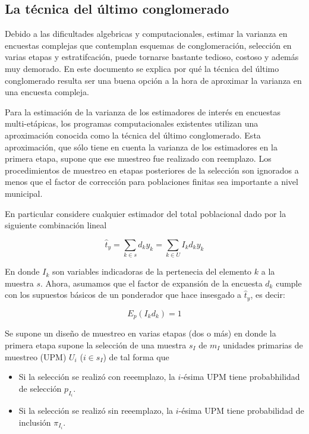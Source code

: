 \hypertarget{la-tecnica-del-ultimo-conglomerado}{%
\subsection{La técnica del último conglomerado}\label{la-tecnica-del-ultimo-conglomerado}}

Debido a las dificultades algebricas y computacionales, estimar la varianza en encuestas complejas que contemplan esquemas de conglomeración, selección en varias etapas y estratifcación, puede tornarse bastante tedioso, costoso y además muy demorado. En este documento se explica por qué la técnica del último conglomerado resulta ser una buena opción a la hora de aproximar la varianza en una encuesta compleja.

Para la estimación de la varianza de los estimadores de interés en encuestas multi-etápicas, los programas computacionales existentes utilizan una aproximación conocida como la técnica del último conglomerado. Esta aproximación, que sólo tiene en cuenta la varianza de los estimadores en la primera etapa, supone que ese muestreo fue realizado con reemplazo. Los procedimientos de muestreo en etapas posteriores de la selección son ignorados a menos que el factor de corrección para poblaciones finitas sea importante a nivel municipal.

En particular considere cualquier estimador del total poblacional dado por la siguiente combinación lineal

\begin{equation}
\label{est}
\hat{t}_{y}=\sum_{k\in s} d_k y_k = \sum_{k\in U} I_k d_k y_k 
\end{equation}

En donde \(I_k\) son variables indicadoras de la pertenecia del elemento \(k\) a la muestra \(s\). Ahora, asumamos que el factor de expansión de la encuesta \(d_k\) cumple con los supuestos básicos de un ponderador que hace insesgado a \(\hat{t}_{y}\), es decir:

\begin{equation*}
E_p(I_k d_k) = 1
\end{equation*}

Se supone un diseño de muestreo en varias etapas (dos o más) en donde la primera etapa supone la selección de una muestra \(s_I\) de \(m_I\) unidades primarias de muestreo (UPM) \(U_i\) (\(i\in s_I\)) de tal forma que

\begin{itemize}
\tightlist
\item
  Si la selección se realizó con reeemplazo, la \(i\)-ésima UPM tiene probabhilidad de selección \(p_{I_i}\).
\item
  Si la selección se realizó sin reeemplazo, la \(i\)-ésima UPM tiene probabilidad de inclusión \(\pi_{I_i}\).
\end{itemize}


